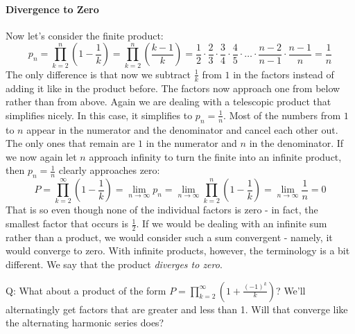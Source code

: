 \paragraph{Divergence to Zero}
Now let's consider the finite product:
\begin{equation}
 p_n = \prod_{k=2}^n  \left(1 - \frac{1}{k} \right)
     = \prod_{k=2}^n  \left(\frac{k - 1}{k} \right)
     = \frac{1}{2} \cdot \frac{2}{3} \cdot \frac{3}{4} \cdot \frac{4}{5} 
       \cdot \ldots \cdot \frac{n-2}{n-1} \cdot \frac{n-1}{n}
     = \frac{1}{n}
\end{equation}
The only difference is that now we subtract $\frac{1}{k}$ from $1$ in the factors instead of adding it like in the product before. The factors now approach one from below rather than from above. Again we are dealing with a telescopic product that simplifies nicely. In this case, it simplifies to $p_n = \frac{1}{n}$. Most of the numbers from $1$ to $n$ appear in the numerator and the denominator and cancel each other out. The only ones that remain are $1$ in the numerator and $n$ in the denominator. If we now again let $n$ approach infinity to turn the finite into an infinite product, then $p_n = \frac{1}{n}$ clearly approaches zero:
\begin{equation}
 P = \prod_{k=2}^{\infty} \left(1 - \frac{1}{k} \right)
   = \lim_{n \rightarrow \infty} p_n 
   = \lim_{n \rightarrow \infty} \prod_{k=2}^n  \left(1 - \frac{1}{k} \right)
   = \lim_{n \rightarrow \infty} \frac{1}{n} 
   = 0
\end{equation}
That is so even though none of the individual factors is zero - in fact, the smallest factor that occurs is $\frac{1}{2}$. If we would be dealing with an infinite sum rather than a product, we would consider such a sum convergent - namely, it would converge to zero. With infinite products, however, the terminology is a bit different. We say that the product \emph{diverges to zero}. 

\medskip
Q: What about a product of the form $P = \prod_{k=2}^{\infty} \left(1 + \frac{(-1)^k}{k} \right)$? We'll alternatingly get factors that are greater and less than 1. Will that converge like the alternating harmonic series does?



